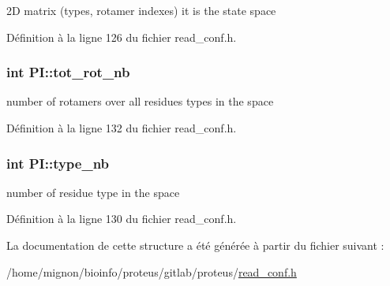 2\+D matrix (types, rotamer indexes) it is the state space 



Définition à la ligne 126 du fichier read\+\_\+conf.\+h.

\hypertarget{struct_p_i_a484820c535c3c1c8f9fc4b6550b0d2fb}{
\subsubsection[{tot\+\_\+rot\+\_\+nb}]{\setlength{\rightskip}{0pt plus 5cm}int P\+I\+::tot\+\_\+rot\+\_\+nb}}\label{struct_p_i_a484820c535c3c1c8f9fc4b6550b0d2fb}


number of rotamers over all residues types in the space 



Définition à la ligne 132 du fichier read\+\_\+conf.\+h.

\hypertarget{struct_p_i_a954c178498f0744535e44aa722ee43ef}{
\subsubsection[{type\+\_\+nb}]{\setlength{\rightskip}{0pt plus 5cm}int P\+I\+::type\+\_\+nb}}\label{struct_p_i_a954c178498f0744535e44aa722ee43ef}


number of residue type in the space 



Définition à la ligne 130 du fichier read\+\_\+conf.\+h.



La documentation de cette structure a été générée à partir du fichier suivant \+:\begin{DoxyCompactItemize}
\item 
/home/mignon/bioinfo/proteus/gitlab/proteus/\hyperlink{read__conf_8h}{read\+\_\+conf.\+h}\end{DoxyCompactItemize}
